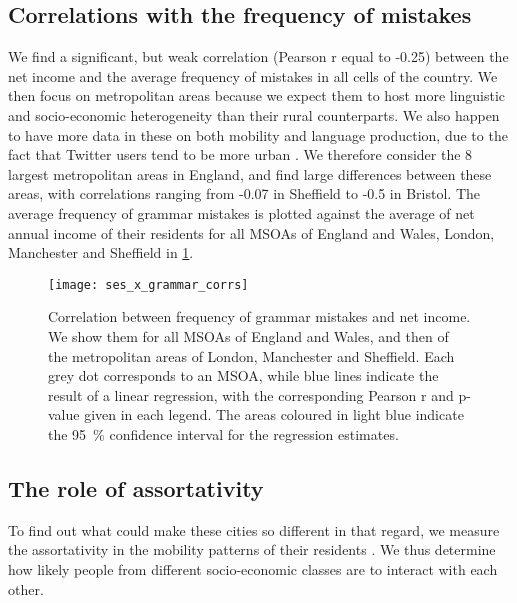 \documentclass[../thesis.tex]{subfiles}
\begin{document}
\subsection{Correlations with the frequency of mistakes}
We find a significant, but weak correlation (Pearson r
equal to -0.25) between the net income and the average frequency of mistakes in all
cells of the country. We then focus on metropolitan areas because we expect them to host
more linguistic and socio-economic heterogeneity than their rural counterparts. We also
happen to have more data in these on both mobility and language production, due to the
fact that Twitter users tend to be more urban
\cite{MisloveUnderstandingDemographics2011}. We therefore consider the 8 largest
metropolitan areas in England, and find large differences between these areas, with
correlations ranging from -0.07 in Sheffield to -0.5 in Bristol. The average frequency
of grammar mistakes is plotted against the average of net annual income of their
residents for all \acp{MSOA} of England and Wales, London, Manchester and Sheffield in
\cref{fig:ses_x_grammar_corrs}.
\begin{figure}
\centering
  \texttt{[image: ses\_x\_grammar\_corrs]}
  \caption{ Correlation between frequency of grammar mistakes and net income. We show
  them for all \acp{MSOA} of England and Wales, and then of the metropolitan areas of
  London, Manchester and Sheffield. Each grey dot corresponds to an \ac{MSOA}, while
  blue lines indicate the result of a linear regression, with the corresponding Pearson
  r and p-value given in each legend. The areas coloured in light blue indicate the
  \SI{95}{\percent} confidence interval for the regression estimates.}
  \label{fig:ses_x_grammar_corrs}
\end{figure}


\subsection{The role of assortativity}

To find out what could make these cities so different in that regard, we measure the
assortativity in the mobility patterns of their residents
\cite{HilmanSocioeconomicBiases2022}. We thus determine how likely people from different
socio-economic classes are to interact with each other.
\end{document}
